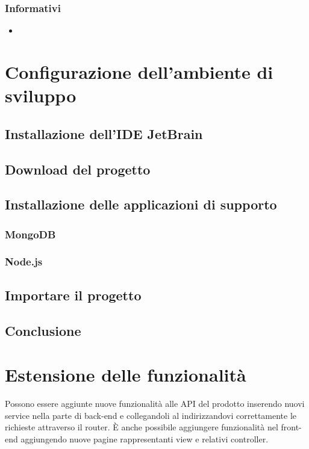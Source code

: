 \documentclass[12pt,a4paper]{article}
\begin{document}
	\subsubsection{Informativi}
	\begin{itemize}
		\item \TODO{}
	\end{itemize}
	
	\newpage
	\section{Configurazione dell'ambiente di sviluppo}
	\subsection{Installazione dell'IDE JetBrain}
	\subsection{Download del progetto}
	\subsection{Installazione delle applicazioni di supporto}
	\subsubsection{MongoDB}
	\subsubsection{Node.js}
	\subsection{Importare il progetto}
	\subsection{Conclusione}
	\newpage
	\section{Estensione delle funzionalità}
	Possono essere aggiunte nuove funzionalità alle API del prodotto inserendo nuovi service nella parte di back-end e collegandoli al indirizzandovi correttamente le richieste attraverso il router. È anche possibile aggiungere funzionalità nel front-end aggiungendo nuove pagine rappresentanti view e relativi controller.
\end{document}

